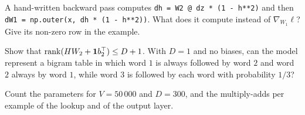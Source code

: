 \begin{notechapter}
\begin{exercise}\label{bigram-neural:exr:2}
A hand-written backward pass computes \texttt{dh = W2 @ dz * (1 - h**2)} and then
\texttt{dW1 = np.outer(x, dh * (1 - h**2))}. What does it compute instead of $\nabla_{W_1}\ell$? Give its non-zero row in
the example.
\end{exercise}

\begin{exercise}\label{bigram-neural:exr:3}
Show that $\operatorname{rank}(HW_2 + \mathbf 1b_2^\top)\leq D + 1$. With $D = 1$ and no biases, can the model represent a bigram table
in which word $1$ is always followed by word $2$ and word $2$ always by word $1$, while word $3$ is
followed by each word with probability $1/3$?
\end{exercise}

\begin{exercise}\label{bigram-neural:exr:4}
Count the parameters for $V = 50\,000$ and $D = 300$, and the multiply-adds per example of the lookup and
of the output layer.
\end{exercise}
\end{notechapter}
